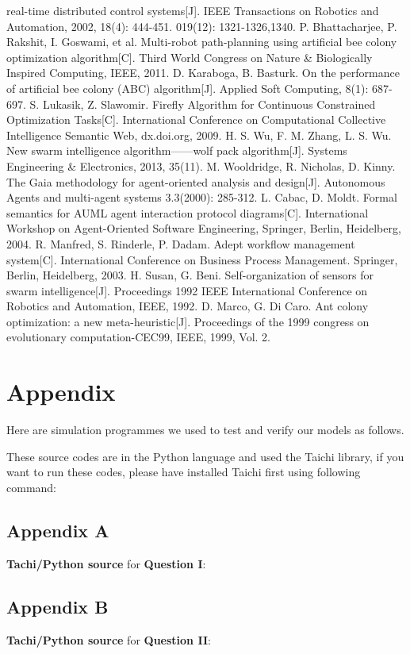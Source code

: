 \documentclass{mcmthesis}
\begin{document}
\begin{thebibliography}{99}
real-time distributed control systems[J]. IEEE Transactions on Robotics and Automation,
2002, 18(4): 444-451.
019(12): 1321-1326,1340.
\bibitem P. Bhattacharjee, P. Rakshit, I. Goswami, et al. Multi-robot path-planning using artificial
bee colony optimization algorithm[C]. Third World Congress on Nature \& Biologically Inspired
Computing, IEEE, 2011.
\bibitem D. Karaboga, B. Basturk. On the performance of artificial bee colony (ABC) algorithm[J].
Applied Soft Computing, 8(1): 687-697.
\bibitem S. Lukasik, Z. Slawomir. Firefly Algorithm for Continuous Constrained Optimization
Tasks[C]. International Conference on Computational Collective Intelligence Semantic Web,
dx.doi.org, 2009.
\bibitem H. S. Wu, F. M. Zhang, L. S. Wu. New swarm intelligence algorithm——wolf pack
algorithm[J]. Systems Engineering \& Electronics, 2013, 35(11).
\bibitem M. Wooldridge, R. Nicholas, D. Kinny. The Gaia methodology for agent-oriented analysis
and design[J]. Autonomous Agents and multi-agent systems 3.3(2000): 285-312.
\bibitem L. Cabac, D. Moldt. Formal semantics for AUML agent interaction protocol
diagrams[C]. International Workshop on Agent-Oriented Software Engineering, Springer,
Berlin, Heidelberg, 2004.
\bibitem R. Manfred, S. Rinderle, P. Dadam. Adept workflow management system[C]. International
Conference on Business Process Management. Springer, Berlin, Heidelberg, 2003.
\bibitem H. Susan, G. Beni. Self-organization of sensors for swarm intelligence[J]. Proceedings
1992 IEEE International Conference on Robotics and Automation, IEEE, 1992.
\bibitem D. Marco, G. Di Caro. Ant colony optimization: a new meta-heuristic[J]. Proceedings of
the 1999 congress on evolutionary computation-CEC99, IEEE, 1999, Vol. 2.
\end{thebibliography}

\newpage
\section{Appendix}
Here are simulation programmes we used to test and verify our models as follows. \par
These source codes are in the Python language and used the Taichi library, if you want to run these codes, please have installed Taichi first using following command:



\subsection{Appendix A}
\textbf{\textcolor[rgb]{0.98,0.00,0.00}{Tachi/Python source}} for \textbf{\textcolor[rgb]{0.00,0.00,0.98}{Question I}}:


\subsection{Appendix B}
\textbf{\textcolor[rgb]{0.98,0.00,0.00}{Tachi/Python source}} for \textbf{\textcolor[rgb]{0.00,0.00,0.98}{Question II}}:

\end{document}
